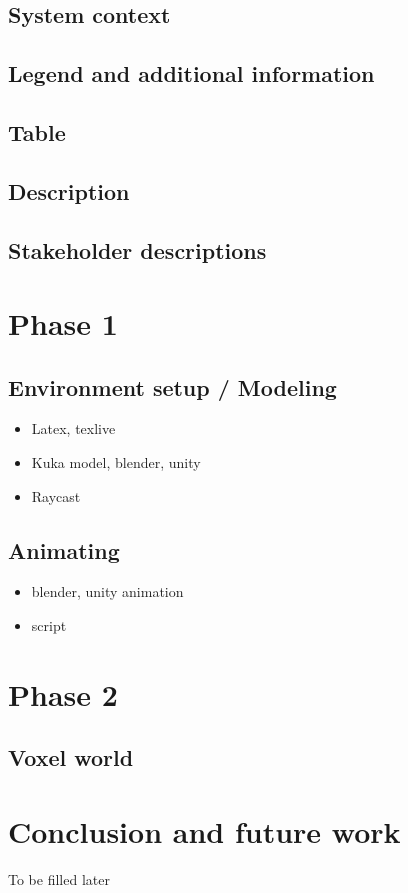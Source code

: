 \documentclass{scrartcl}
\begin{document}
\subsection{System context}
\subsection{Legend and additional information}
\subsection{Table}
\subsection{Description}
\subsection{Stakeholder descriptions}

\clearpage

\section{Phase 1}
\subsection{Environment setup / Modeling}
\begin{itemize}
  \item Latex, texlive
  \item Kuka model, blender, unity
  \item Raycast
\end{itemize}

\subsection{Animating}
\begin{itemize}
  \item blender, unity animation
  \item script
\end{itemize}

\clearpage

\section{Phase 2}
\subsection{Voxel world}

\clearpage

\section{Conclusion and future work}
To be filled later


\printbibliography[heading=bibintoc]
\end{document}
